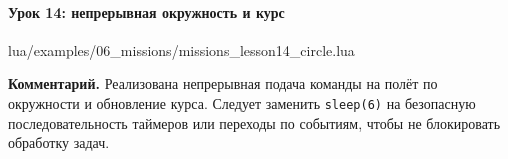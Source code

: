 \paragraph{Урок 14: непрерывная окружность и курс}
\begin{codefile}{lua/examples/06_missions/missions_lesson14_circle.lua}
\end{codefile}
\textbf{Комментарий.} Реализована непрерывная подача команды на полёт по окружности и обновление курса. Следует заменить \texttt{sleep(6)} на безопасную последовательность таймеров или переходы по событиям, чтобы не блокировать обработку задач.
